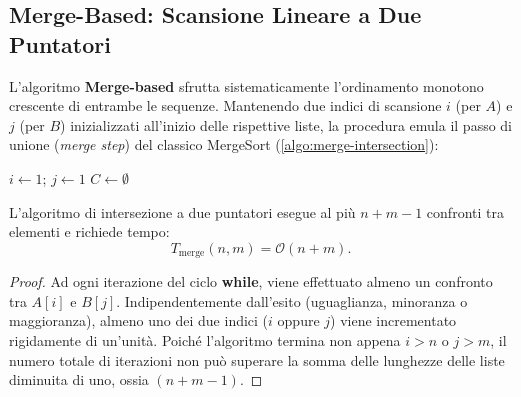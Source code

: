\subsection{Merge-Based: Scansione Lineare a Due Puntatori}
L'algoritmo \textbf{Merge-based} sfrutta sistematicamente l'ordinamento monotono crescente di entrambe le sequenze. Mantenendo due indici di scansione $i$ (per $A$) e $j$ (per $B$) inizializzati all'inizio delle rispettive liste, la procedura emula il passo di unione (\textit{merge step}) del classico MergeSort (\autoref{algo:merge-intersection}):

\begin{algorithm}[htbp]
\SetAlgoLined
{}
$i \leftarrow 1$; $j \leftarrow 1$\;
$C \leftarrow \emptyset$\;
\;
\caption{Intersezione Merge-Based a Due Puntatori}
\label{algo:merge-intersection}
\end{algorithm}

\begin{theorem}
L'algoritmo di intersezione a due puntatori esegue al più $n + m - 1$ confronti tra elementi e richiede tempo:
\begin{equation}
  T_{\text{merge}}(n, m) = \mathcal{O}(n + m).
\end{equation}
\end{theorem}
\begin{proof}
Ad ogni iterazione del ciclo \textbf{while}, viene effettuato almeno un confronto tra $A[i]$ e $B[j]$. Indipendentemente dall'esito (uguaglianza, minoranza o maggioranza), almeno uno dei due indici ($i$ oppure $j$) viene incrementato rigidamente di un'unità. Poiché l'algoritmo termina non appena $i > n$ o $j > m$, il numero totale di iterazioni non può superare la somma delle lunghezze delle liste diminuita di uno, ossia $(n + m - 1)$.
\end{proof}

